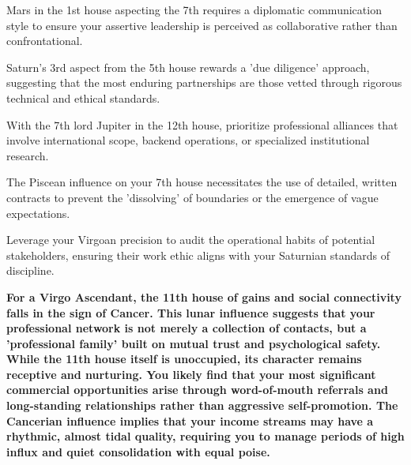 \begin{diamondlist}
  \item {\fontsize{8.5}{12}\selectfont Mars in the 1st house aspecting the 7th requires a diplomatic communication style to ensure your assertive leadership is perceived as collaborative rather than confrontational.}
  \item {\fontsize{8.5}{12}\selectfont Saturn's 3rd aspect from the 5th house rewards a 'due diligence' approach, suggesting that the most enduring partnerships are those vetted through rigorous technical and ethical standards.}
  \item {\fontsize{8.5}{12}\selectfont With the 7th lord Jupiter in the 12th house, prioritize professional alliances that involve international scope, backend operations, or specialized institutional research.}
  \item {\fontsize{8.5}{12}\selectfont The Piscean influence on your 7th house necessitates the use of detailed, written contracts to prevent the 'dissolving' of boundaries or the emergence of vague expectations.}
  \item {\fontsize{8.5}{12}\selectfont Leverage your Virgoan precision to audit the operational habits of potential stakeholders, ensuring their work ethic aligns with your Saturnian standards of discipline.}
\end{diamondlist}


\label{topic20}

{\fontsize{9.5}{13.8}\selectfont\bfseries\color{DeepSlate} For a Virgo Ascendant, the 11th house of gains and social connectivity falls in the sign of Cancer. This lunar influence suggests that your professional network is not merely a collection of contacts, but a 'professional family' built on mutual trust and psychological safety. While the 11th house itself is unoccupied, its character remains receptive and nurturing. You likely find that your most significant commercial opportunities arise through word-of-mouth referrals and long-standing relationships rather than aggressive self-promotion. The Cancerian influence implies that your income streams may have a rhythmic, almost tidal quality, requiring you to manage periods of high influx and quiet consolidation with equal poise.}\par\vspace{2mm}

